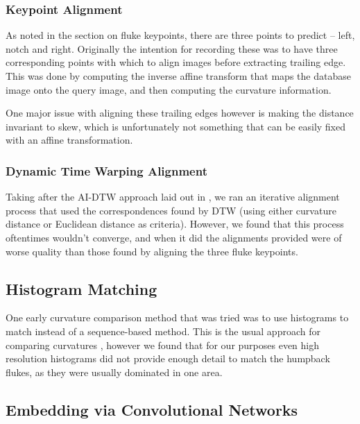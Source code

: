\subsubsection{Keypoint Alignment}

As noted in the section on fluke keypoints, there are three points to predict -- left, notch and right.
Originally the intention for recording these was to have three corresponding points with which to align images before extracting trailing edge.
This was done by computing the inverse affine transform that maps the database image onto the query image, and then computing the curvature information.

One major issue with aligning these trailing edges however is making the distance invariant to skew, which is unfortunately not something that can be easily fixed with an affine transformation.

\subsubsection{Dynamic Time Warping Alignment}

Taking after the AI-DTW approach laid out in \cite{qiao2006affine}, we ran an iterative alignment process that used the correspondences found by DTW (using either curvature distance or Euclidean distance as criteria).
However, we found that this process oftentimes wouldn't converge, and when it did the alignments provided were of worse quality than those found by aligning the three fluke keypoints.

\subsection{Histogram Matching}

One early curvature comparison method that was tried was to use histograms to match instead of a sequence-based method.
This is the usual approach for comparing curvatures \cite{kumar2012leafsnap}, %
however we found that for our purposes even high resolution histograms did not provide enough detail to match the humpback flukes, as they were usually dominated in one area.

\subsection{Embedding via Convolutional Networks}

